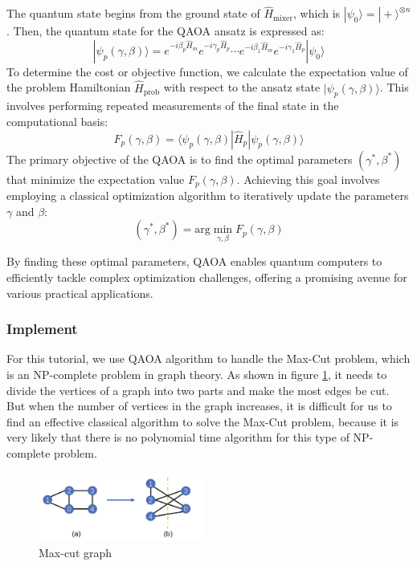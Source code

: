 The quantum state begins from the ground state of $\hat{H}_{\text{mixer}}$, which is $|\psi_0\rangle=|+\rangle^{\otimes n}$. Then, the quantum state for the QAOA ansatz is expressed as:
\begin{equation}
    |\psi_p(\gamma, \beta)\rangle = e^{-i\beta_p\hat{H}_m}e^{-i\gamma_p\hat{H}_p}\cdots e^{-i\beta_1\hat{H}_{m}}e^{-i\gamma_1\hat{H}_{p}}|\psi_0\rangle
\end{equation}
To determine the cost or objective function, we calculate the expectation value of the problem Hamiltonian $\hat{H}_{\text{prob}}$ with respect to the ansatz state $|\psi_p(\gamma, \beta)\rangle$. This involves performing repeated measurements of the final state in the computational basis:
\begin{equation}
    F_p(\gamma, \beta) =\langle\psi_p(\gamma, \beta)|\hat{H}_{p} |\psi_p(\gamma,\beta)\rangle
\end{equation}
The primary objective of the QAOA is to find the optimal parameters $(\gamma^*, \beta^*)$ that minimize the expectation value $F_p(\gamma, \beta)$. Achieving this goal involves employing a classical optimization algorithm to iteratively update the parameters $\gamma$ and $\beta$:
\begin{equation}
    (\gamma^*, \beta^*) = \text{arg}\min_{\gamma, \beta} F_p(\gamma, \beta)
\end{equation}

By finding these optimal parameters, QAOA enables quantum computers to efficiently tackle complex optimization challenges, offering a promising avenue for various practical applications.




\subsubsection{Implement}

For this tutorial, we use QAOA algorithm to handle the Max-Cut problem,  which is an NP-complete problem in graph theory. As shown in figure \ref{5.1_QAOA}, it needs to divide the vertices of a graph into two parts and make the most edges be cut. But when the number of vertices in the graph increases, it is difficult for us to find an effective classical algorithm to solve the Max-Cut problem, because it is very likely that there is no polynomial time algorithm for this type of NP-complete problem.

\begin{figure}[H]
    \centering
    \includegraphics[width=0.49\textwidth]{5.2_figures/5.2_QAOA}
    \caption{Max-cut graph}
    \label{5.1_QAOA}
\end{figure}

